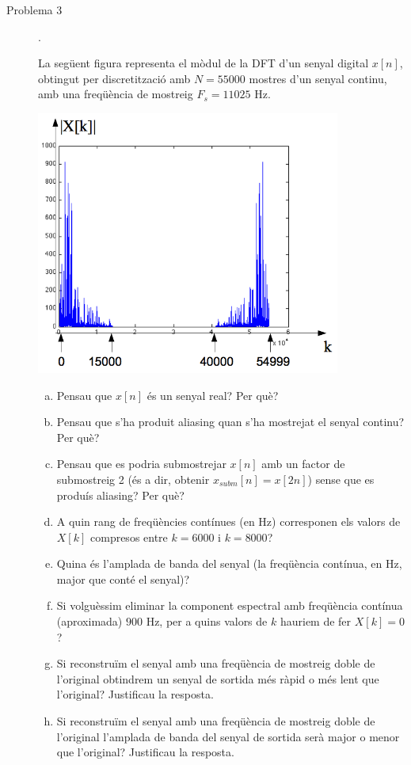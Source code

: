 \documentclass{article}[12pt]
\begin{document}
\begin{description}
\vskip 0.5cm


\item[Problema 3].

La següent figura representa el mòdul de la DFT d'un senyal digital $x[n]$,
obtingut per discretització amb $N=55000$ mostres d'un senyal continu,
amb una freqüència de mostreig $F_s=11025$ Hz.

\begin{center}
\includegraphics[width=10cm]{fftP3b.png}
\end{center}

\begin{enumerate}[a)]
\item Pensau que $x[n]$ és un senyal real? Per què?
\item Pensau que s'ha produit aliasing quan s'ha mostrejat el senyal continu? Per què?
\item Pensau que es podria submostrejar $x[n]$ amb un factor de submostreig 2
(és a dir, obtenir $x_{subm}[n]=x[2n]$) sense que es produís aliasing? Per què?
\item A quin rang de freqüències contínues (en Hz)  corresponen els valors de $X[k]$ compresos entre $k=6000$ i $k=8000$?
\item Quina és l'amplada de banda del senyal (la freqüència contínua, en Hz, major que conté el senyal)?
\item Si volguèssim eliminar la component espectral amb freqüència contínua (aproximada) $900$ Hz, per a quins
valors de $k$ hauriem de fer $X[k]=0$?
\item Si reconstruïm el senyal amb una freqüència de mostreig doble de l'original obtindrem un senyal
de sortida més ràpid o més lent que l'original? Justificau la resposta.
\item Si reconstruïm el senyal amb una freqüència de mostreig doble de l'original l'amplada de banda del
senyal de sortida serà major o menor que l'original? Justificau la resposta.
\end{enumerate}  


\end{description}
\end{document}
